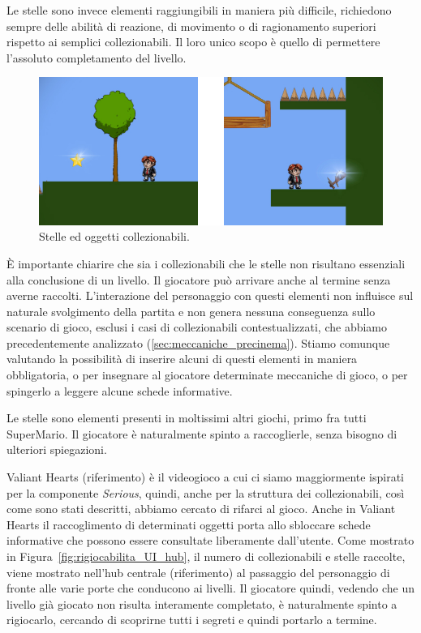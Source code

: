 Le stelle sono invece elementi raggiungibili in maniera più difficile, richiedono sempre delle abilità di reazione, di movimento o di ragionamento superiori rispetto ai semplici collezionabili. Il loro unico scopo è quello di permettere l’assoluto completamento del livello.

\begin{figure}%
	\centering
	\includegraphics[width= 0.9\columnwidth]{images/gameDesign/25_stelle_collezionabili.jpg}
	\caption{Stelle ed oggetti collezionabili.}
	\label{fig:rigiocabilita_stelle_collezionabili}
\end{figure} 

È importante chiarire che sia i collezionabili che le stelle non risultano essenziali alla conclusione di un livello. Il giocatore può arrivare anche al termine senza averne raccolti. L’interazione del personaggio con questi elementi non influisce sul naturale svolgimento della partita e non genera nessuna conseguenza sullo scenario di gioco, esclusi i casi di collezionabili contestualizzati, che abbiamo precedentemente analizzato (\ref{sec:meccaniche_precinema}). Stiamo comunque valutando la possibilità di inserire alcuni di questi elementi in maniera obbligatoria, o per insegnare al giocatore determinate meccaniche di gioco, o per spingerlo a leggere alcune schede informative.

Le stelle sono elementi presenti in moltissimi altri giochi, primo fra tutti SuperMario. Il giocatore è naturalmente spinto a raccoglierle, senza bisogno di ulteriori spiegazioni.

Valiant Hearts (riferimento) è il videogioco a cui ci siamo maggiormente ispirati per la componente \textit{Serious}, quindi, anche per la struttura dei collezionabili, così come sono stati descritti, abbiamo cercato di rifarci al gioco. Anche in Valiant Hearts il raccoglimento di determinati oggetti porta allo sbloccare schede informative che possono essere consultate liberamente dall’utente.
Come mostrato in Figura~\ref{fig:rigiocabilita_UI_hub}, il numero di collezionabili e stelle raccolte, viene mostrato nell’hub centrale (riferimento) al passaggio del personaggio di fronte alle varie porte che conducono ai livelli. Il giocatore quindi, vedendo che un livello già giocato non risulta interamente completato, è naturalmente spinto a rigiocarlo, cercando di scoprirne tutti i segreti e quindi portarlo a termine.

